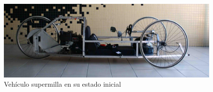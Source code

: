 \begin{figure}
\centering
\includegraphics[width=4.5in]{fotos/inicial}
\caption{Vehículo supermilla en su estado inicial}
\label{fig:fotos:inicial}
\end{figure}
